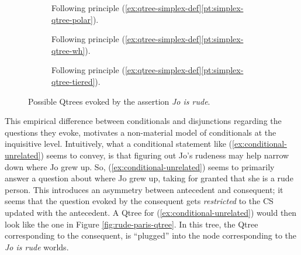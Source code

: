\begin{exe}
	\ex
	\begin{xlist}
		\label{ex:conditional-unrelated}
		\label{ex:material-conditional-underlated}
	\end{xlist}
\end{exe}

\begin{figure}[H]
	\centering
	\begin{subfigure}[t]{.2\linewidth}
		\centering\scalebox{.85}{
		\begin{forest}
			[CS[Rude][$\neg$Rude]]
		\end{forest}}
		\caption{Following principle (\ref{ex:qtree-simplex-def}\ref{pt:simplex-qtree-polar}).}
	\end{subfigure}
	\hfill
	\begin{subfigure}[t]{.75\linewidth}
		\centering\scalebox{.85}{
		\begin{forest}
			[CS[Rude$\wedge$Smart][$\neg$Rude$\wedge$Smart][Rude$\wedge$$\neg$Smart][$\neg$Rude$\wedge$$\neg$Smart]]
		\end{forest}}
		\caption{Following principle (\ref{ex:qtree-simplex-def}\ref{pt:simplex-qtree-wh}).}
	\end{subfigure}
	
	\begin{subfigure}[t]{\linewidth}
		\centering\scalebox{.85}{
		\begin{forest}
			[CS[Good traits [$\neg$Rude$\wedge$Smart]][Bad traits [Rude$\wedge$$\neg$Smart]][Mixed traits [Rude$\wedge$Smart][$\neg$Rude$\wedge$$\neg$Smart]]]
		\end{forest}}
		\caption{Following principle (\ref{ex:qtree-simplex-def}\ref{pt:simplex-qtree-tiered}).}
	\end{subfigure}
	\caption{Possible Qtrees evoked by the assertion \textit{Jo is rude}.}\label{fig:rude-qtrees}
\end{figure}


This empirical difference between conditionals and disjunctions regarding the questions they evoke, motivates a non-material model of conditionals at the inquisitive level. Intuitively, what a conditional statement like (\ref{ex:conditional-unrelated}) seems to convey, is that figuring out Jo's rudeness may help narrow down where Jo grew up. So, (\ref{ex:conditional-unrelated}) seems to primarily answer a question about where Jo grew up, taking for granted that she is a rude person. This introduces an asymmetry between antecedent and consequent; it seems that the question evoked by the consequent gets \textit{restricted} to the CS updated with the antecedent. A Qtree for (\ref{ex:conditional-unrelated}) would then look like the one in Figure \ref{fig:rude-paris-qtree}. In this tree, the Qtree corresponding to the consequent, is ``plugged'' into the node corresponding to the \textit{Jo is rude} worlds.

